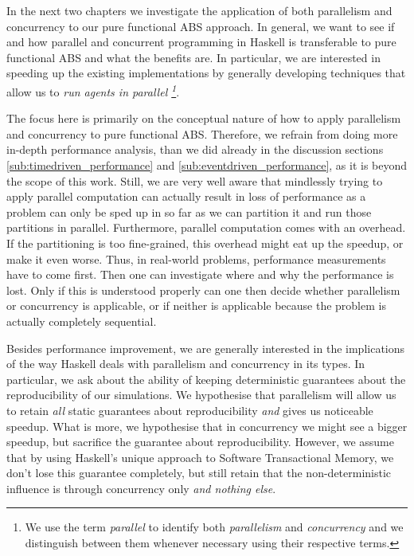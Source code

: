 In the next two chapters we investigate the application of both parallelism and concurrency to our pure functional ABS approach. In general, we want to see if and how parallel and concurrent programming in Haskell is transferable to pure functional ABS and what the benefits are. In particular, we are interested in speeding up the existing implementations by generally developing techniques that allow us to  \textit{run agents in parallel \footnote{We use the term \textit{parallel} to identify both \textit{parallelism} and \textit{concurrency} and we distinguish between them whenever necessary using their respective terms.}}. 

The focus here is primarily on the conceptual nature of how to apply parallelism and concurrency to pure functional ABS. Therefore, we refrain from doing more in-depth performance analysis, than we did already in the discussion sections \ref{sub:timedriven_performance} and \ref{sub:eventdriven_performance}, as it is beyond the scope of this work. Still, we are very well aware that mindlessly trying to apply parallel computation can actually result in loss of performance as a problem can only be sped up in so far as we can partition it and run those partitions in parallel. Furthermore, parallel computation comes with an overhead. If the partitioning is too fine-grained, this overhead might eat up the speedup, or make it even worse. Thus, in real-world problems, performance measurements have to come first. Then one can investigate where and why the performance is lost. Only if this is understood properly can one then decide whether parallelism or concurrency is applicable, or if neither is applicable because the problem is actually completely sequential. %

Besides performance improvement, we are generally interested in the implications of the way Haskell deals with parallelism and concurrency in its types. In particular, we ask about the ability of keeping deterministic guarantees about the reproducibility of our simulations. We hypothesise that parallelism will allow us to retain \textit{all} static guarantees about reproducibility \textit{and} gives us noticeable speedup. What is more, we hypothesise that in concurrency we might see a bigger speedup, but sacrifice the guarantee about reproducibility. However, we assume that by using Haskell's unique approach to Software Transactional Memory, we don't lose this guarantee completely, but still retain that the non-deterministic influence is through concurrency only \textit{and nothing else}.



